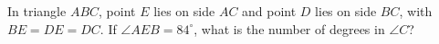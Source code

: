 In triangle $ABC$, point $E$ lies on side $AC$ and point $D$ lies on side $BC$, with $BE=DE=DC$. If $\angle AEB=84^\circ$, what is the number of degrees in $\angle C$?
